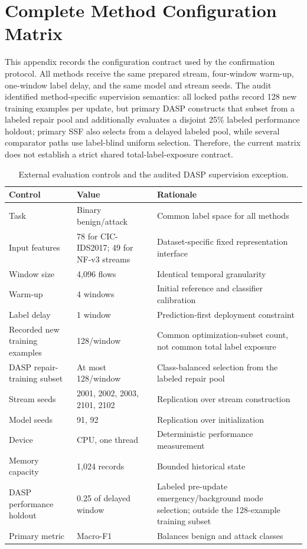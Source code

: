 \section{Complete Method Configuration Matrix}
\label{app:method-matrix}

This appendix records the configuration contract used by the confirmation protocol. All methods receive the same prepared stream, four-window warm-up, one-window label delay, and the same model and stream seeds. The audit identified method-specific supervision semantics: all locked paths record 128 new training examples per update, but primary DASP constructs that subset from a labeled repair pool and additionally evaluates a disjoint 25\% labeled performance holdout; primary SSF also selects from a delayed labeled pool, while several comparator paths use label-blind uniform selection. Therefore, the current matrix does not establish a strict shared total-label-exposure contract.

\begin{table}[t]
\caption{External evaluation controls and the audited DASP supervision exception.}
\label{tab:shared-contract}
\centering
\begin{tabular}{p{}p{}p{}}
\toprule
Control & Value & Rationale\\
\midrule
Task & Binary benign/attack & Common label space for all methods\\
Input features & 78 for CIC-IDS2017; 49 for NF-v3 streams & Dataset-specific fixed representation interface\\
Window size & 4,096 flows & Identical temporal granularity\\
Warm-up & 4 windows & Initial reference and classifier calibration\\
Label delay & 1 window & Prediction-first deployment constraint\\
Recorded new training examples & 128/window & Common optimization-subset count, not common total label exposure\\
DASP repair-training subset & At most 128/window & Class-balanced selection from the labeled repair pool\\
Stream seeds & 2001, 2002, 2003, 2101, 2102 & Replication over stream construction\\
Model seeds & 91, 92 & Replication over initialization\\
Device & CPU, one thread & Deterministic performance measurement\\
Memory capacity & 1,024 records & Bounded historical state\\
DASP performance holdout & 0.25 of delayed window & Labeled pre-update emergency/background mode selection; outside the 128-example training subset\\
Primary metric & Macro-F1 & Balances benign and attack classes\\
\bottomrule
\end{tabular}
\end{table}

